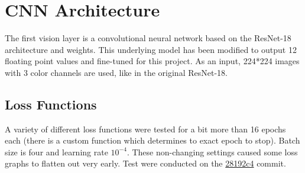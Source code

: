 \documentclass[a4paper,11pt]{report}
\begin{document}
    
        \section{CNN Architecture}
            The first vision layer is a convolutional neural network based on the ResNet-18 \cite{he2015deepresiduallearningimage} architecture and weights. This underlying model has been modified to output 12 floating point values and fine-tuned for this project. As an input, 224*224 images with 3 color channels are used, like in the original ResNet-18. 
            
            \subsection{Loss Functions}
                A variety of different loss functions were tested for a bit more than 16 epochs each (there is a custom function which determines to exact epoch to stop). Batch size is four and learning rate $10^{-4}$. These non-changing settings caused some loss graphs to flatten out very early. Test were conducted on the \href{https://github.com/lenamerkli/ingredient-scanner/tree/28192c4232818b29222363ee129ea6ac86af0e0b}{28192c4} commit.
\end{document}
